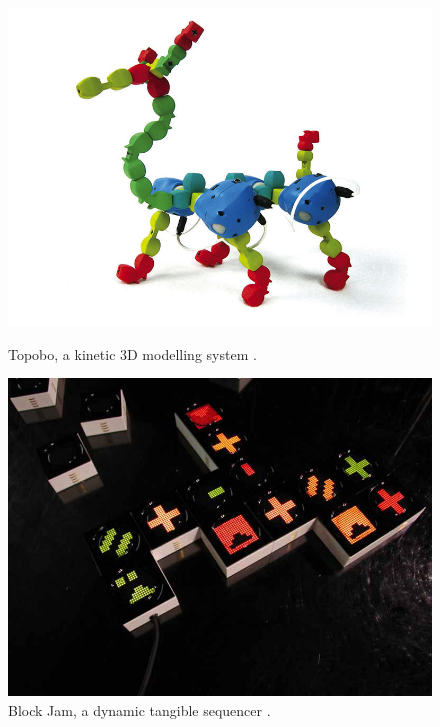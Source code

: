 \begin{figure}[h]
\centering
\begin{minipage}[t]{.44\textwidth}
  \centering
  \includegraphics[width=\linewidth]{figures/proto3/topobo}
  \caption{Topobo, a kinetic 3D modelling system \citep{raffle2004topobo}.}
  \label{topobo}
\end{minipage}%
\hspace{0.02\textwidth}
\begin{minipage}[t]{.44\textwidth}
  \centering
  \includegraphics[width=\linewidth]{figures/proto3/blockjam}
  \caption{Block Jam, a dynamic tangible sequencer \citep{newton2003block}.}
  \label{blockjam}
\end{minipage}
\end{figure}

